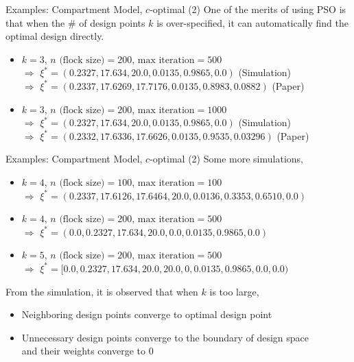 \documentclass{beamer}
\begin{document}
\begin{frame}{Examples: Compartment Model, $c$-optimal (2)}
  One of the merits of using PSO is that when the \# of design points $k$ is over-specified, it can automatically find the optimal design directly.\\
  \vspace{3mm}
  \begin{itemize}
    \item $k=3$, $n\text{ (flock size)}=200$, $\text{max iteration} = 500$\\
    $\Rightarrow$ $\xi^*= (0.2327, 17.634, 20.0, 0.0135, 0.9865, 0.0)$ (Simulation)\\
    $\Rightarrow$ $\xi^*= (0.2337, 17.6269, 17.7176, 0.0135, 0.8983, 0.0882)$ (Paper)\\
    \item $k=3$, $n\text{ (flock size)}=200$, $\text{max iteration} = 1000$\\
    $\Rightarrow$ $\xi^*= (0.2327, 17.634, 20.0, 0.0135, 0.9865, 0.0)$ (Simulation)\\
    $\Rightarrow$ $\xi^*= (0.2332, 17.6336, 17.6626, 0.0135, 0.9535, 0.03296)$ (Paper)\\
  \end{itemize}
\end{frame}

\begin{frame}{Examples: Compartment Model, $c$-optimal (2)}
  Some more simulations,
  \begin{itemize}
    \item $k=4$, $n\text{ (flock size)}=100$, $\text{max iteration} = 100$\\
    $\Rightarrow$ $\xi^*= (0.2337, 17.6126, 17.6464, 20.0, 0.0136, 0.3353, 0.6510, 0.0)$\\
    \item $k=4$, $n\text{ (flock size)}=200$, $\text{max iteration} = 500$\\
    $\Rightarrow$ $\xi^*= (0.0, 0.2327, 17.634, 20.0, 0.0, 0.0135, 0.9865, 0.0)$\\
    \item $k=5$, $n\text{ (flock size)}=200$, $\text{max iteration} = 500$\\
    $\Rightarrow$ $\xi^*= [0.0, 0.2327, 17.634, 20.0, 20.0, 0, 0.0135, 0.9865, 0.0, 0.0)$\\
  \end{itemize}
  \vspace{3mm}
  From the simulation, it is observed that when $k$ is too large, 
  \begin{itemize}
    \item Neighboring design points converge to optimal design point
    \item Unnecessary design points converge to the boundary of design space\\
    and their weights converge to 0
  \end{itemize}
\end{frame}
\end{document}
